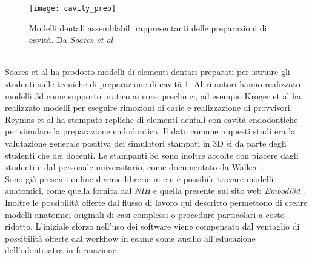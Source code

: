 \begin{figure}[h]
\vspace{-10pt}
	\begin{center}
	\texttt{[image: cavity\_prep]}
    \caption{Modelli dentali assemblabili rappresentanti delle preparazioni di cavità. Da \emph{Soares et al} \parencite{Reference71}}
    \label{fig:cavity_prep}
    \end{center}
\vspace{-20pt}
\end{figure}
\\ 
Soares et al \parencite{Reference71} ha prodotto modelli di elementi dentari preparati per istruire gli studenti sulle tecniche di preparazione di cavità \ref{fig:cavity_prep}. Altri autori hanno realizzato modelli 3d come supporto pratico ai corsi preclinici, ad esempio Kroger et al \parencite{Reference72} ha realizzato modelli per eseguire rimozioni di carie e realizzazione di provvisori; Reymus et al \parencite{Reference73} ha stampato repliche di elementi dentali con cavità endodontiche per simulare la preparazione endodontica. Il dato comune a questi studi era la valutazione generale positiva dei simulatori stampati in 3D si da parte degli studenti che dei docenti. Le stampanti 3d sono inoltre accolte con piacere dagli studenti e dal personale universitario, come documentato da Walker \parencite{Reference74}.\\
Sono già presenti online diverse librerie in cui è possibile trovare modelli anatomici, come quella fornita dal \emph{NIH} \parencite{Reference75} e quella presente sul sito web \emph{Embodi3d} \parencite{Reference76}. Inoltre le possibilità offerte dal flusso di lavoro qui descritto permettono di creare modelli anatomici originali di casi complessi o procedure particolari a costo ridotto. L'iniziale sforzo nell'uso dei software viene compensato dal ventaglio di possibilità offerte dal workflow in esame come ausilio all'educazione dell'odontoiatra in formazione.

